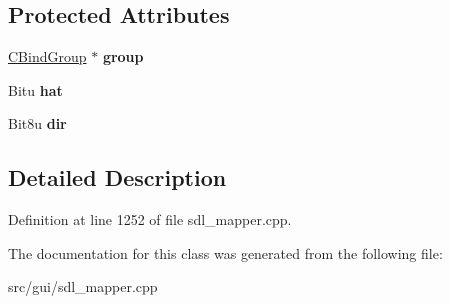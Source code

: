\subsection*{Protected Attributes}
\begin{DoxyCompactItemize}
\item 
\hypertarget{classCJHatBind_a29b7138a9094d140fad3bb6bef01b3e2}{\hyperlink{classCBindGroup}{C\-Bind\-Group} $\ast$ {\bfseries group}}\label{classCJHatBind_a29b7138a9094d140fad3bb6bef01b3e2}

\item 
\hypertarget{classCJHatBind_a652e1ca02ee3c415917d41bd557a25ba}{Bitu {\bfseries hat}}\label{classCJHatBind_a652e1ca02ee3c415917d41bd557a25ba}

\item 
\hypertarget{classCJHatBind_a2b02bbb8de4fc7bb9941f535254dad19}{Bit8u {\bfseries dir}}\label{classCJHatBind_a2b02bbb8de4fc7bb9941f535254dad19}

\end{DoxyCompactItemize}


\subsection{Detailed Description}


Definition at line 1252 of file sdl\-\_\-mapper.\-cpp.



The documentation for this class was generated from the following file\-:\begin{DoxyCompactItemize}
\item 
src/gui/sdl\-\_\-mapper.\-cpp\end{DoxyCompactItemize}
